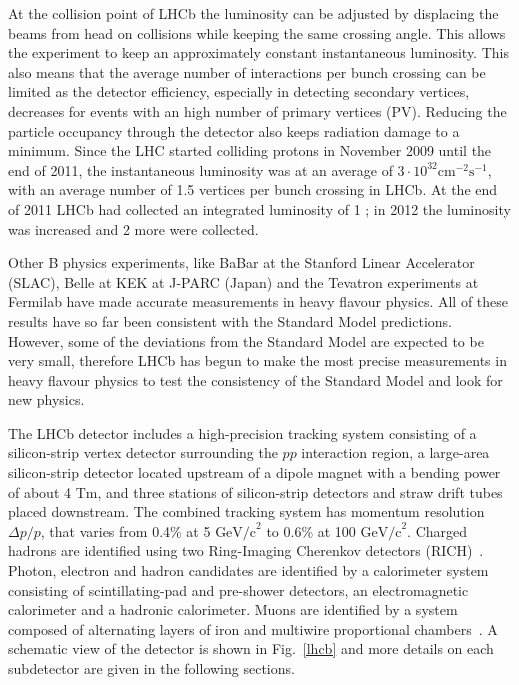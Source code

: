 At the collision point of LHCb the luminosity can be adjusted by displacing the beams from head on collisions
while keeping the same crossing angle. This allows the experiment to keep an approximately constant instantaneous
luminosity. This also means that the average number of interactions per bunch crossing can be limited as the detector
efficiency, especially in detecting secondary vertices, decreases for events with an high number of primary vertices (PV).
Reducing the particle occupancy through the detector also keeps radiation damage to a minimum. Since the LHC started colliding
protons in November 2009 until the end of 2011, the instantaneous luminosity was at an average of
$3 \cdot 10^{32} \mbox{cm}^{-2}\mbox{s}^{-1}$, with an average number of 1.5 vertices per bunch crossing in LHCb.
At the end of 2011 LHCb had collected an integrated luminosity of 1 \invfb; in 2012 the luminosity was increased
and 2 \invfb more were collected.

Other B physics experiments, like BaBar at the Stanford Linear Accelerator (SLAC), Belle at KEK at J-PARC (Japan)
and the Tevatron experiments at Fermilab have made accurate measurements in heavy flavour physics. All of these
results have so far been consistent with the Standard Model predictions. However, some of the deviations from the
Standard Model are expected to be very small, therefore LHCb has begun to make the most precise measurements
in heavy flavour physics to test the consistency of the Standard Model and look for new physics.

The LHCb detector includes a high-precision tracking system consisting of a silicon-strip
vertex detector surrounding the $pp$ interaction region, a large-area silicon-strip detector located upstream
of a dipole magnet with a bending power of about 4 Tm, and three stations of silicon-strip detectors and straw
drift tubes placed downstream. The combined tracking system has momentum resolution $\Delta p/p$, that varies
from 0.4\% at 5 $\mbox{GeV/c}^{2}$ to 0.6\% at 100 $\mbox{GeV/c}^{2}$. Charged hadrons are identified using two
Ring-Imaging Cherenkov detectors (RICH)~\cite{LHCb-DP-2012-003}. Photon, electron and hadron candidates are
identified by a calorimeter system consisting of scintillating-pad and pre-shower detectors, an electromagnetic
calorimeter and a hadronic calorimeter. Muons are identified by a system composed of alternating layers of iron
and multiwire proportional chambers~\cite{LHCb-DP-2012-002}. A schematic view of the detector is shown in Fig.~\ref{lhcb}
and more details on each subdetector are given in the following sections.


